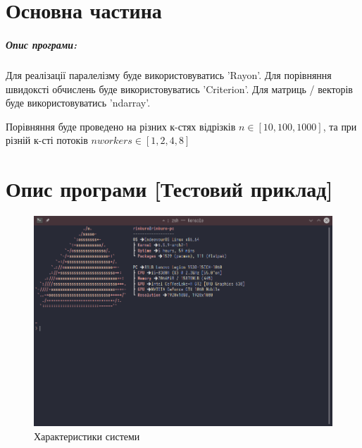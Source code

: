 \documentclass{udstu}
\begin{document}
\chapter{Основна частина}
\label{chap:1}

\paragraph{\textbf{Опис програми:}}

Для реалізації паралелізму буде використовуватись 'Rayon'.
Для порівняння швидоксті обчислень буде використовуватись 'Criterion'.
Для матриць / векторів буде використовуватись 'ndarray'.

Порівняння буде проведено на різних к-стях відрізків $n \in [10, 100, 1000]$,
та при різній к-сті потоків $nworkers \in [1,2,4,8]$


\chapter{Опис програми [Тестовий приклад]}
\label{chap:3}

\begin{figure}[!htp]
	\centering
	\includegraphics[scale=0.5]{PNG/system-specs.png}
	\caption{Характеристики системи}
	\label{fig:figure1}
\end{figure}
\end{document}
